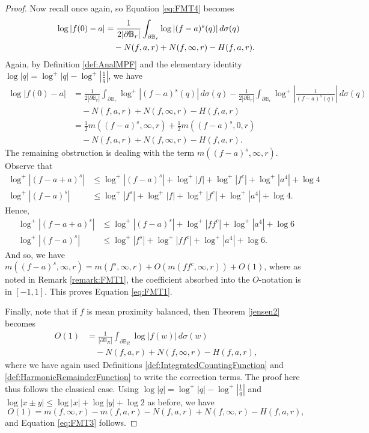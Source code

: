 \documentclass{amsart}
\begin{document}
\begin{proof}
    Now recall \cite[Proposition 8]{perottiJensen2019} once again, so Equation \ref{eq:FMT4} becomes \begin{align*}
         \log|f(0)-a|&=\frac{1}{2|\partial\mathbb B_r|}\int_{\partial\mathbb B_r}\log|(f-a)^s(q)|\,d\sigma(q) \\
        &\quad - N(f,a,r)+N(f,\infty,r) -H(f,a,r) \notag.
    \end{align*} Again, by Definition \ref{def:AnalMPF} and the elementary identity  $\log|q|=\log^+|q|-\log^+\left|\frac{1}{q}\right|$, we have 
    \begin{align*}
        \log|f(0)-a|&=\frac{1}{2|\partial\mathbb B_r|}\int_{\partial\mathbb B_r}\log^+|(f-a)^s(q)|\,d\sigma(q)-\frac{1}{2|\partial\mathbb B_r|}\int_{\partial\mathbb B_r}\log^+\left|\frac{1}{(f-a)^s(q)}\right|\,d\sigma(q) \\
        &\quad - N(f,a,r)+N(f,\infty,r) -H(f,a,r) \\
        &=\frac{1}{2}m((f-a)^s,\infty,r)+\frac{1}{2}m((f-a)^s,0,r) \\
        &\quad - N(f,a,r)+N(f,\infty,r) -H(f,a,r) .\end{align*}
The remaining obstruction is dealing with the term $m((f-a)^s,\infty,r)$. Observe that \begin{align*}
    \log^+|(f-a+a)^s|&\leq \log^+|(f-a)^s|+\log^+|f|+\log^+|f^c|+\log^+|a^4|+\log 4 \\
    \log^+|(f-a)^s|&\leq \log^+|f^s|+\log^+|f|+\log^+|f^c|+\log^+|a^4|+\log 4.
\end{align*}
Hence, 
\begin{align*}
    \log^+|(f-a+a)^s|&\leq \log^+|(f-a)^s|+\log^+|ff^c|+\log^+|a^4|+\log6\\
    \log^+|(f-a)^s|&\leq \log^+|f^s|+\log^+|ff^c|+\log^+|a^4|+\log 6.
\end{align*}
And so, we have $m((f-a)^s,\infty,r)=m(f^s,\infty,r)+O(m(ff^c,\infty,r))+O(1)$, where as noted in Remark \ref{remark:FMT1}, the coefficient absorbed into the $O$-notation is in $[-1,1]$. This proves Equation \ref{eq:FMT1}. 

Finally, note that if $f$ is mean proximity balanced, then Theorem \ref{jensen2} becomes \begin{align*}
    O(1) &= \frac{1}{|\partial \mathbb B_R|}\int_{\partial \mathbb B_R}\log|f(w)|\,d\sigma(w) \\  
   &\quad -N(f,a,r)+N(f,\infty,r)-H(f,a,r), \end{align*} where we have again used Definitions \ref{def:IntegratedCountingFunction} and \ref{def:HarmonicRemainderFunction} to write the correction terms. The proof here thus follows the classical case. Using $\log|q|=\log^+|q|-\log^+\left|\frac{1}{q}\right|$ and $\log|x\pm y|\leq \log|x|+\log|y|+\log 2$ as before, we have \[O(1)=m(f,\infty,r)-m(f,a,r)-N(f,a,r)+N(f,\infty,r)-H(f,a,r),\] and Equation \ref{eq:FMT3} follows.   
\end{proof}
\end{document}
